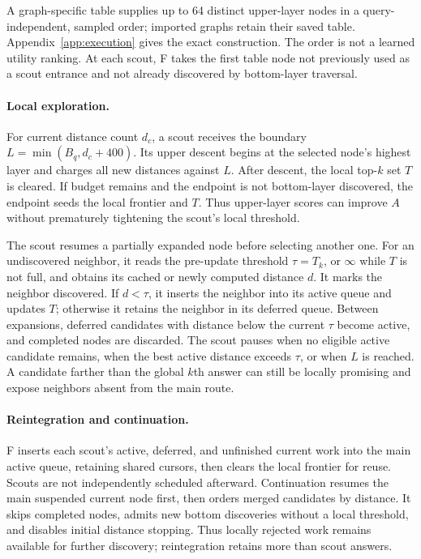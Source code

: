 A graph-specific table supplies up to 64 distinct upper-layer nodes in a
query-independent, sampled order; imported graphs retain their saved table.
Appendix~\ref{app:execution} gives the exact construction.
The order is not a learned utility ranking.
At each scout, F takes the first table node not previously used as a scout
entrance and not already discovered by bottom-layer traversal.

\paragraph{Local exploration.}
For current distance count $d_c$, a scout receives the boundary
$L=\min(B_q,d_c+400)$.
Its upper descent begins at the selected node's highest layer and charges
all new distances against $L$.
After descent, the local top-$k$ set $T$ is cleared.
If budget remains and the endpoint is not bottom-layer discovered, the
endpoint seeds the local frontier and $T$.
Thus upper-layer scores can improve $A$ without prematurely tightening
the scout's local threshold.

The scout resumes a partially expanded node before selecting another one.
For an undiscovered neighbor, it reads the pre-update threshold
$\tau=T_k$, or $\infty$ while $T$ is not full, and obtains its cached
or newly computed distance $d$.
It marks the neighbor discovered.
If $d<\tau$, it inserts the neighbor into its active queue and updates $T$;
otherwise it retains the neighbor in its deferred queue.
Between expansions, deferred candidates with distance below the current
$\tau$ become active, and completed nodes are discarded.
The scout pauses when no eligible active candidate remains, when the
best active distance exceeds $\tau$, or when $L$ is reached.
A candidate farther than the global $k$th answer can still be locally
promising and expose neighbors absent from the main route.

\paragraph{Reintegration and continuation.}
F inserts each scout's active, deferred, and unfinished current work into
the main active queue, retaining shared cursors, then clears the local
frontier for reuse. Scouts are not independently scheduled afterward.
Continuation resumes the main suspended current node first, then orders
merged candidates by distance. It skips completed nodes, admits new
bottom discoveries without a local threshold, and disables initial
distance stopping. Thus locally rejected work remains available for
further discovery; reintegration retains more than scout answers.

